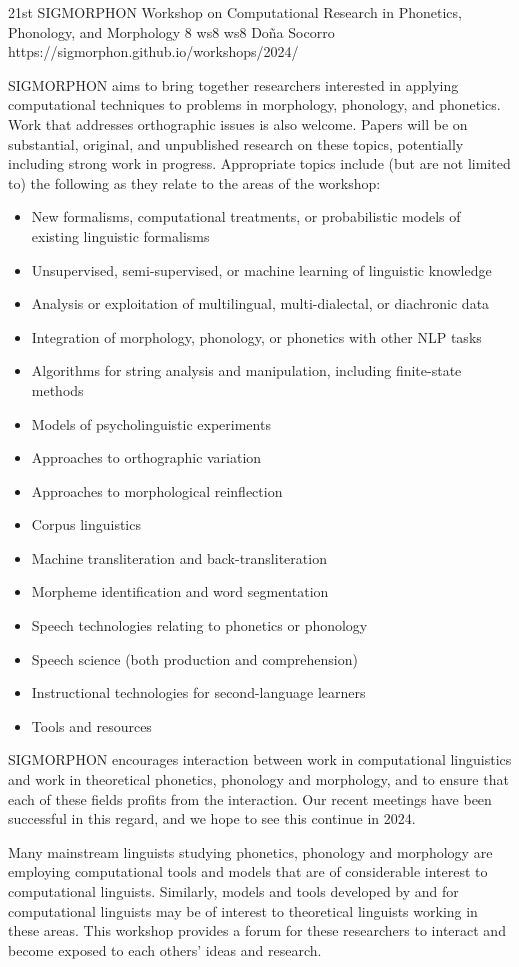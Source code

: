 \begin{wsschedulenolist}
{21st SIGMORPHON Workshop on Computational Research in Phonetics, Phonology, and Morphology}
{8}
{ws8}
{ws8}
{Do\~na Socorro}
{https://sigmorphon.github.io/workshops/2024/}

SIGMORPHON aims to bring together researchers interested in applying computational techniques to problems in morphology, phonology, and phonetics. Work that addresses orthographic issues is also welcome. Papers will be on substantial, original, and unpublished research on these topics, potentially including strong work in progress. Appropriate topics include (but are not limited to) the following as they relate to the areas of the workshop:

\begin{itemize}
\item New formalisms, computational treatments, or probabilistic models of existing linguistic formalisms
\item Unsupervised, semi-supervised, or machine learning of linguistic knowledge
\item Analysis or exploitation of multilingual, multi-dialectal, or diachronic data
\item Integration of morphology, phonology, or phonetics with other NLP tasks
\item Algorithms for string analysis and manipulation, including finite-state methods
\item Models of psycholinguistic experiments
\item Approaches to orthographic variation
\item Approaches to morphological reinflection
\item Corpus linguistics
\item Machine transliteration and back-transliteration
\item Morpheme identification and word segmentation
\item Speech technologies relating to phonetics or phonology
\item Speech science (both production and comprehension)
\item Instructional technologies for second-language learners
\item Tools and resources
\end{itemize}

SIGMORPHON encourages interaction between work in computational linguistics and work in theoretical phonetics, phonology and morphology, and to ensure that each of these fields profits from the interaction. Our recent meetings have been successful in this regard, and we hope to see this continue in 2024.

Many mainstream linguists studying phonetics, phonology and morphology are employing computational tools and models that are of considerable interest to computational linguists. Similarly, models and tools developed by and for computational linguists may be of interest to theoretical linguists working in these areas. This workshop provides a forum for these researchers to interact and become exposed to each others’ ideas and research.

\end{wsschedulenolist}
